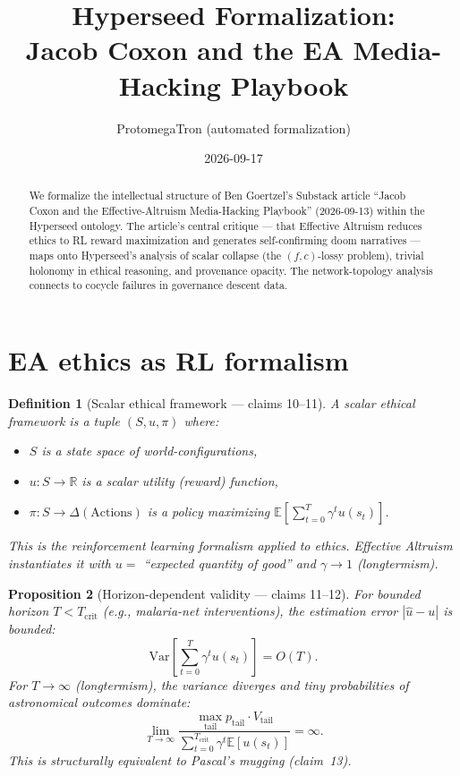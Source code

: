 \documentclass[11pt,a4paper]{article}
\title{Hyperseed Formalization:\\
  Jacob Coxon and the EA Media-Hacking Playbook}
\author{ProtomegaTron (automated formalization)}
\date{2026-09-17}
\newtheorem{definition}{Definition}[section]
\newtheorem{proposition}[definition]{Proposition}
\begin{document}
\maketitle

\begin{abstract}
We formalize the intellectual structure of Ben Goertzel's Substack article
``Jacob Coxon and the Effective-Altruism Media-Hacking Playbook''
(2026-09-13) within the Hyperseed ontology. The article's central critique
--- that Effective Altruism reduces ethics to RL reward maximization and
generates self-confirming doom narratives --- maps onto Hyperseed's analysis
of scalar collapse (the $(f,c)$-lossy problem), trivial holonomy in
ethical reasoning, and provenance opacity. The network-topology analysis
connects to cocycle failures in governance descent data.
\end{abstract}

\tableofcontents

\section{EA ethics as RL formalism}
\label{sec:ea-rl}

\begin{definition}[Scalar ethical framework --- claims 10--11]
\label{def:scalar-ethics}
A \emph{scalar ethical framework} is a tuple $(S, u, \pi)$ where:
\begin{itemize}
\item $S$ is a state space of world-configurations,
\item $u : S \to \mathbb{R}$ is a scalar utility (reward) function,
\item $\pi : S \to \Delta(\text{Actions})$ is a policy maximizing
  $\mathbb{E}\left[\sum_{t=0}^{T} \gamma^t u(s_t)\right]$.
\end{itemize}
This is the reinforcement learning formalism applied to ethics.
Effective Altruism instantiates it with $u = $ ``expected quantity of good''
and $\gamma \to 1$ (longtermism).
\end{definition}

\begin{proposition}[Horizon-dependent validity --- claims 11--12]
\label{prop:horizon}
For bounded horizon $T < T_{\text{crit}}$ (e.g., malaria-net interventions),
the estimation error $|\hat{u} - u|$ is bounded:
\[
  \text{Var}\left[\sum_{t=0}^{T} \gamma^t u(s_t)\right] = O(T).
\]
For $T \to \infty$ (longtermism), the variance diverges and tiny
probabilities of astronomical outcomes dominate:
\[
  \lim_{T \to \infty} \frac{\max_{\text{tail}} p_{\text{tail}} \cdot V_{\text{tail}}}
  {\sum_{t=0}^{T_{\text{crit}}} \gamma^t \mathbb{E}[u(s_t)]} = \infty.
\]
This is structurally equivalent to Pascal's mugging (claim~13).
\end{proposition}
\end{document}
